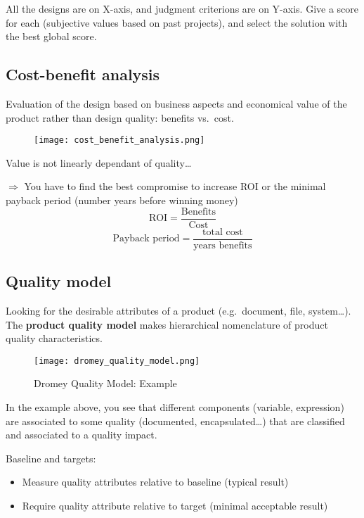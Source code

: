 All the designs are on X-axis, and judgment criterions are on Y-axis. 
Give a score for each (subjective values based on past projects), and
select the solution with the best global score.

\subsection{Cost-benefit analysis}

Evaluation of the design based on business aspects and economical value
of the product rather than design quality: benefits vs.\ cost.

\begin{figure}[!ht]
    \centering
    \texttt{[image: cost\_benefit\_analysis.png]}
\end{figure}

Value is not linearly dependant of quality\ldots

$\Rightarrow$ You have to find the best compromise to increase ROI
or the minimal payback period (number years before winning money)
$$ \text{ROI} = \frac{\text{Benefits}}{\text{Cost}}$$
$$\text{Payback period} = \frac{\text{total cost}}{\text{years benefits}}$$

\subsection{Quality model}

Looking for the desirable attributes of a product (e.g.\ document, file,
system\ldots).
The \textbf{product quality model} makes hierarchical nomenclature of product quality characteristics. 
\newline

\begin{figure}[!ht]
    \centering
    \texttt{[image: dromey\_quality\_model.png]}
    \caption{Dromey Quality Model: Example}
\end{figure}

In the example above, you see that different components (variable,
expression) are associated to some quality (documented,
encapsulated\ldots) that are classified and associated to a quality
impact. 

Baseline and targets:
\begin{itemize}
    \item Measure quality attributes relative to baseline (typical result)
    \item Require quality attribute relative to target (minimal acceptable result)
\end{itemize}

